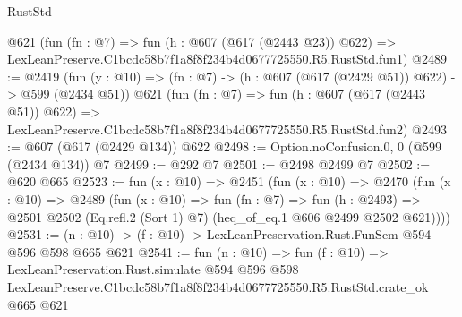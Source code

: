 \begin{lexlean}{RustStd}
\begin{coremodule}
    @621
    (fun (fn : @7) =>
    fun (h : @607 (@617 (@2443 @23)) @622) =>
    LexLeanPreserve.C1bcdc58b7f1a8f8f234b4d0677725550.R5.RustStd.fun1)
@2489 := @2419
    (fun (y : @10) => (fn : @7) -> (h : @607 (@617 (@2429 @51)) @622) -> @599 (@2434 @51))
    @621
    (fun (fn : @7) =>
    fun (h : @607 (@617 (@2443 @51)) @622) =>
    LexLeanPreserve.C1bcdc58b7f1a8f8f234b4d0677725550.R5.RustStd.fun2)
@2493 := @607 (@617 (@2429 @134)) @622
@2498 := Option.noConfusion.{0, 0} (@599 (@2434 @134)) @7
@2499 := @292 @7
@2501 := @2498 @2499 @7
@2502 := @620 @665
@2523 := fun (x : @10) =>
  @2451
    (fun (x : @10) =>
    @2470
      (fun (x : @10) =>
      @2489
        (fun (x : @10) =>
        fun (fn : @7) =>
        fun (h : @2493) =>
        @2501 @2502 (Eq.refl.{2} (Sort 1) @7) (heq_of_eq.{1} @606 @2499 @2502 @621))))
@2531 := (n : @10) -> (f : @10) -> LexLeanPreservation.Rust.FunSem @594 @596 @598 @665 @621
@2541 := fun (n : @10) =>
  fun (f : @10) =>
  LexLeanPreservation.Rust.simulate
    @594
    @596
    @598
    LexLeanPreserve.C1bcdc58b7f1a8f8f234b4d0677725550.R5.RustStd.crate_ok
    @665
    @621
\end{coremodule}
\end{lexlean}
